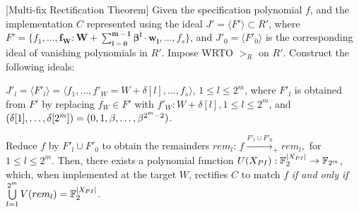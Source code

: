\begin{Theorem}{[Multi-fix Rectification Theorem]}\label{Thm:rect}
Given the specification polynomial $f$, and the implementation
$C$ represented using the ideal $J' = \langle F'\rangle\subset R'$,
where $F'=\{f_1,\dots,\bm{f_W:W+\sum_{i=0}^{m-1}\beta^i \cdot w_i},
\dots,f_s\}$, and $J'_0=\langle F'_0\rangle$ is the corresponding ideal
of vanishing polynomials in $R'$. Impose WRTO $>_R$ on $R'$.
Construct the following ideals: 

\bi
\item {\small $J'_l = \langle F'_l\rangle =\langle f_1,\dots,f'_W=W+\delta[l],\dots,f_s\rangle$},
  $1 \leq l \leq 2^m$, where $F'_l$ is obtained from $F'$ by
  replacing $f_W \in F'$ with $f'_W: W + \delta[l], 1\leq l \leq 2^m$,
  and $(\delta[1],\dots,\delta[2^{m}]) =
  (0,1,\beta,\dots,\beta^{2^m-2})$. 
\ei

Reduce $f$ by $F'_l\cup F'_0$ to obtain the remainders $rem_l$: 
$f\xrightarrow{F'_l\cup F'_{0}}_+ rem_l,$  for $1 \leq l \leq 2^m$. 
Then, there exists a polynomial function 
$U(X_{PI}): {\mathbb{F}}_{2}^{|X_{PI}|}\rightarrow {\mathbb{F}}_{2^m}$, which, when
 implemented at the target $W$, rectifies $C$ to match $f$ \textit{if
   and only if} $\bigcup\limits_{l=1}^{2^m}V(rem_l) = {\mathbb{F}}_{2}^{|X_{PI}|}$.
\end{Theorem}


